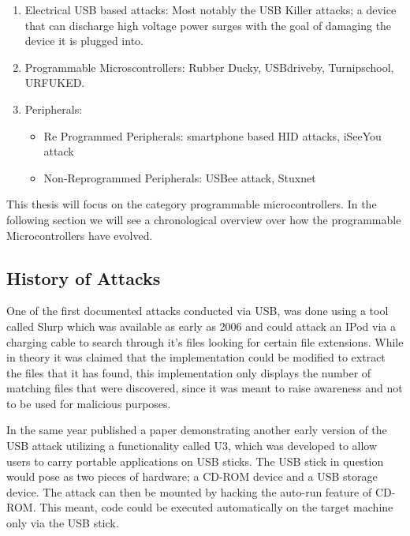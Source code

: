 \begin{enumerate}
  \item Electrical USB based attacks: Most notably the USB Killer attacks; a device that can discharge high voltage power surges with the goal of damaging the device it is plugged into. \cite{USBKillDevices}
  \item Programmable Microscontrollers: Rubber Ducky, USBdriveby, Turnipschool, URFUKED.
  \item Peripherals:
  \begin{itemize}
      \item Re Programmed Peripherals: smartphone based HID attacks, iSeeYou attack
      \item Non-Reprogrammed Peripherals: USBee attack, Stuxnet
  \end{itemize}
\end{enumerate}
	


This thesis will focus on the category programmable microcontrollers. In the following section we will see a chronological overview over how the programmable Microcontrollers have evolved.  

\subsection{History of Attacks}

One of the first documented attacks conducted via USB, was done using a tool called Slurp \cite{SharpIdeasDownloads2006} which was available as early as 2006 and could attack an IPod via a charging cable to search through it's files looking for certain file extensions. While in theory it was claimed that the implementation could be modified to extract the files that it has found, this implementation only displays the number of matching files that were discovered, since it was meant to raise awareness and not to be used for malicious purposes. 

In the same year \cite{al-zarouniRealityRisksConsented2006} published a paper demonstrating another early version of the USB attack utilizing a functionality called U3, which was developed to allow users to carry portable applications on USB sticks. The USB stick in question would pose as two pieces of hardware; a CD-ROM device and a USB storage device. The attack can then be mounted by hacking the auto-run feature of CD-ROM. This meant, code could be executed automatically on the target machine only via the USB stick. 

